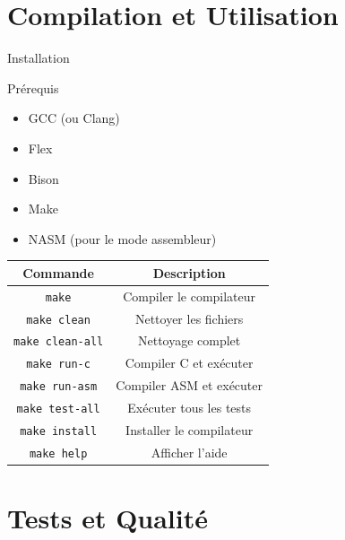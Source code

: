 \documentclass[10pt]{beamer}
\begin{document}
\section{Compilation et Utilisation}

\begin{frame}{Installation}
    \begin{block}{Prérequis}
        \begin{itemize}
            \item GCC (ou Clang)
            \item Flex
            \item Bison
            \item Make
            \item NASM (pour le mode assembleur)
        \end{itemize}
    \end{block}

        \begin{table}
            \begin{tabular}{|c|c|}
                \hline
                \textbf{Commande} & \textbf{Description} \\
                \hline
                \texttt{make} & Compiler le compilateur \\
                \texttt{make clean} & Nettoyer les fichiers \\
                \texttt{make clean-all} & Nettoyage complet \\
                \texttt{make run-c} & Compiler C et exécuter \\
                \texttt{make run-asm} & Compiler ASM et exécuter \\
                \texttt{make test-all} & Exécuter tous les tests \\
                \texttt{make install} & Installer le compilateur \\
                \texttt{make help} & Afficher l'aide \\
                \hline
            \end{tabular}
        \end{table}
\end{frame}

\section{Tests et Qualité}
\end{document}
